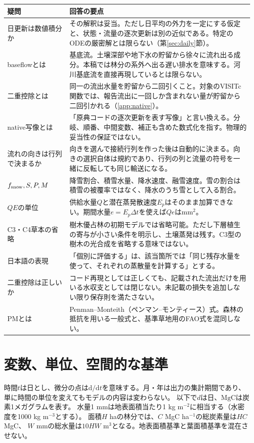 \documentclass[a4paper,11pt]{ltjsarticle}
\newcommand{\dd}{\mathrm d}
\begin{document}
\begin{longtable}{p{.27\linewidth}p{.68\linewidth}}
\toprule 疑問 & 回答の要点\\\midrule\endhead
日更新は数値積分か & その解釈は妥当。ただし日平均の外力を一定にする仮定と、状態・流量の逐次更新は別の近似である。特定のODEの厳密解とは限らない（第\ref{sec:daily}節）。\\
baseflowとは & 基底流。土壌深部や地下水の貯留から徐々に流れ出る成分。本稿では林分の系外へ出る遅い排水を意味する。河川基底流を直接再現しているとは限らない。\\
二重控除とは & 同一の流出水量を貯留から二回引くこと。対象のVISITc関数では、報告流出に一回しか含まれない量が貯留から二回引かれる（\ref{app:native}）。\\
native写像とは & 「原典コードの逐次更新を表す写像」と言い換える。分岐、順番、中間変数、補正も含めた数式化を指す。物理的妥当性の保証ではない。\\
流れの向きは行列で決まるか & 向きを選んで接続行列を作った後は自動的に決まる。向きの選択自体は規約であり、行列の列と流量の符号を一緒に反転しても同じ輸送になる。\\
$f_{\rm snow},S,P,M$ & 降雪割合、積雪水量、降水速度、融雪速度。雪の割合は積雪の被覆率ではなく、降水のうち雪として入る割合。\\
$QE$の単位 & 供給水量$Q$と潜在蒸発散速度$E_p$はそのまま加算できない。期間水量$e=E_p\Delta t$を使えば$Qe$はmm$^2$。\\
C3・C4草本の省略 & 樹木優占林の初期モデルでは省略可能。ただし下層植生の寄与が小さい条件を明示し、土壌蒸発は残す。C3型の樹木の光合成を省略する意味ではない。\\
日本語の表現 & 「個別に評価する」は、該当箇所では「同じ残存水量を使って、それぞれの蒸散量を計算する」とする。\\
二重控除は正しいか & コード再現としては正しくても、記載された流出だけを用いる水収支としては閉じない。未記載の損失を追加しない限り保存則を満たさない。\\
PMとは & Penman--Monteith（ペンマン--モンティース）式。森林の抵抗を用いる一般式と、基準草地用のFAO式を混同しない。\\
\bottomrule
\end{longtable}

\section{変数、単位、空間的な基準}
時間$t$は日とし、微分の点は$\dd/\dd t$を意味する。月・年は出力の集計期間であり、
単に時間の単位を変えてもモデルの内容は変わらない。
以下で$d$は日、$\mathrm{MgC}$は炭素1メガグラムを表す。
水量1 mmは地表面積当たり1 kg m$^{-2}$に相当する（水密度を1000 kg m$^{-3}$とする）。
面積$H$ haの林分では、$C$ MgC ha$^{-1}$の総炭素量は$HC$ MgC、
$W$ mmの総水量は$10HW$ m$^3$となる。地表面積基準と葉面積基準を混在させない。
\end{document}
